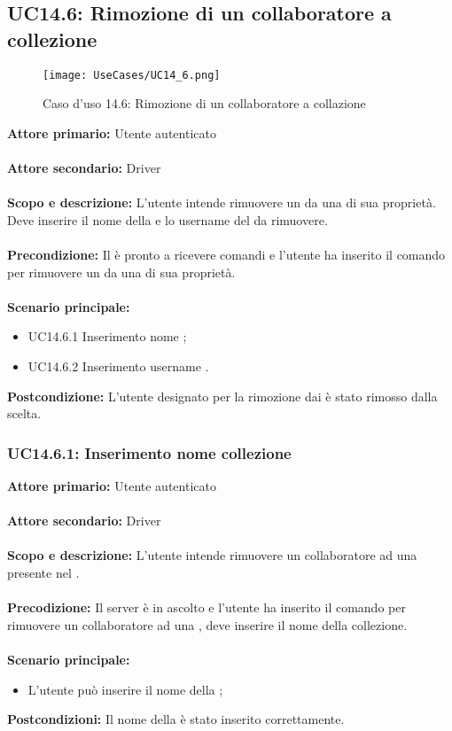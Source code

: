 \documentclass{scalatekids-article}
\begin{document}
\subsection{UC14.6: Rimozione di un collaboratore a collezione}
\begin{figure}[H]
  \begin{center}
    \texttt{[image: UseCases/UC14\_6.png]}
    \caption*{Caso d'uso 14.6: Rimozione di un collaboratore a collazione}
  \end{center}
\end{figure}
\textbf{Attore primario:} Utente autenticato\\ \\
\textbf{Attore secondario:} Driver\\ \\
\textbf{Scopo e descrizione:} L'utente intende rimuovere un  da una  di sua proprietà. Deve inserire il nome della  e lo username del  da rimuovere.\\ \\
\textbf{Precondizione:} Il  è pronto a ricevere comandi e l'utente ha inserito il comando per rimuovere un  da una  di sua proprietà.\\ \\
\textbf{Scenario principale:}
\begin{itemize}
\item UC14.6.1 Inserimento nome ;
\item UC14.6.2 Inserimento username .
\end{itemize}
\textbf{Postcondizione:} L'utente designato per la rimozione dai  è stato rimosso dalla  scelta.

\subsubsection{UC14.6.1: Inserimento nome collezione}

\textbf{Attore primario:} Utente autenticato\\ \\
\textbf{Attore secondario:} Driver\\ \\
\textbf{Scopo e descrizione:} L’utente intende rimuovere un collaboratore ad una  presente nel .\\ \\
\textbf{Precodizione:} Il server è in ascolto e l’utente ha inserito il comando per rimuovere un collaboratore ad una , deve inserire il nome della collezione.\\ \\
\textbf{Scenario principale:}
\begin{itemize}
\item L'utente può inserire il nome della ;
\end{itemize}
\textbf{Postcondizioni:} Il nome della  è stato inserito correttamente.
\end{document}
